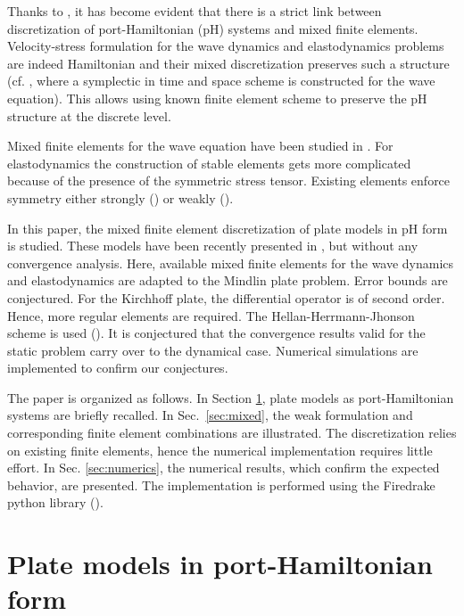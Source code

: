 \documentclass{ifacconf}
\begin{document}
Thanks to \cite{CardosoRibeiro2018}, it has become evident that there is a strict link between  discretization of port-Hamiltonian (pH) systems and mixed finite elements. Velocity-stress formulation for the wave dynamics and elastodynamics problems are indeed Hamiltonian and their mixed discretization preserves such a structure (cf. \cite{Kirby2015}, where a symplectic in time and space scheme is constructed for the wave equation). This allows using known finite element scheme to preserve the pH structure at the discrete level.

Mixed finite elements for the wave equation have been studied in \cite{Geveci,becacheWave}. For elastodynamics the construction of stable elements gets more complicated because of the presence of the symmetric stress tensor. Existing elements enforce symmetry either strongly (\cite{becacheElas}) or weakly (\cite{ArnoldWeak,mindlinVeiga}).

In this paper, the mixed finite element discretization of plate models in pH form is studied. These models have been recently presented in \cite{BRUGNOLI2019940,BRUGNOLI2019961}, but without any convergence analysis. Here, available mixed finite elements for the wave dynamics and elastodynamics are adapted to the Mindlin plate problem. Error bounds are conjectured. For the Kirchhoff plate, the differential operator is of second order. Hence, more regular elements are required. The Hellan-Herrmann-Jhonson scheme is used (\cite{Blum1990,arnold2019hellan}). It is conjectured that the convergence results valid for the static problem carry over to the dynamical case. Numerical simulations are implemented to confirm our conjectures.

The paper is organized as follows. In Section \ref{sec:pHplates}, plate models as port-Hamiltonian systems are briefly recalled. In Sec.~\ref{sec:mixed}, the weak formulation and corresponding finite element combinations are illustrated. The discretization relies on existing finite elements, hence the numerical implementation requires little effort. In Sec. \ref{sec:numerics}, the numerical results, which confirm the expected behavior, are presented. The implementation is performed using the Firedrake python library (\cite{rathgeber2017firedrake}).

\section{Plate models in port-Hamiltonian form}
\label{sec:pHplates}
\end{document}
